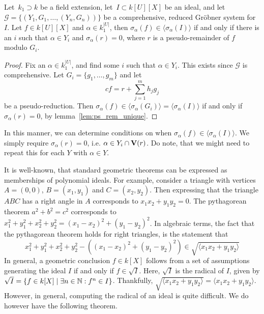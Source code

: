 \begin{theorem}
  Let $\,k_{1} \supset k$ be a field extension, let $\,I \subset k[U][X]$ be an ideal, and let $\mathcal G = \{(Y_{1}, G_{1}, \dots, (Y_{n}, G_{n}))\}$ be a comprehensive, reduced Gröbner system for $I$. Let $f \in k[U][X]$ and $\alpha \in k_{1}^{|U|}$, then $\sigma_{\alpha}(f) \in \langle \sigma_{\alpha}(I) \rangle$ if and only if there is an $i$ such that $\alpha \in Y_{i}$ and $\sigma_{\alpha}(r) = 0$, where $r$ is a pseudo-remainder of $f$ modulo $G_{i}$.
\end{theorem}
\begin{proof}
  Fix an $\alpha \in k_{1}^{|U|}$, and find some $i$ such that $\alpha \in Y_{i}$. This exists since $\mathcal G$ is comprehensive. Let $G_{i} = \{g_{1}, \dots, g_{m}\}$ and let
  \[c f = r + \sum_{j=1}^{m} h_{j} g_{j}\]
  be a pseudo-reduction. Then $\sigma_{\alpha}(f) \in \langle \sigma_{\alpha}(G_{i}) \rangle = \langle \sigma_{\alpha}(I) \rangle$ if and only if $\sigma_{\alpha}(r) = 0$, by lemma~\ref{lem:ps_rem_unique}.
\end{proof}

In this manner, we can determine conditions on when $\sigma_{\alpha}(f) \in \langle \sigma_{\alpha}(I) \rangle$. We simply require $\sigma_{\alpha}(r) = 0$, i.e. $\alpha \in Y_{i} \cap \operatorname{\mathbf V}(r)$. Do note, that we might need to repeat this for each $Y$ with $\alpha \in Y$.

It is well-known, that standard geometric theorems can be expressed as memberships of polynomial ideals. For example, consider a triangle with vertices $A = (0, 0)$, $B = (x_{1}, y_{1})$ and $C = (x_{2}, y_{2})$. Then expressing that the triangle $ABC$ has a right angle in $A$ corresponds to $x_{1} x_{2} + y_{1} y_{2} = 0$. The pythagorean theorem $a^{2} + b^{2} = c^{2}$ corresponds to $x_{1}^{2} + y_{1}^{2} + x_{2}^{2} + y_{2}^{2} = {(x_{1} - x_{2})}^{2} + {(y_{1} - y_{2})}^{2}$. In algebraic terms, the fact that the pythagorean theorem holds for right triangles, is the statement that
\[x_{1}^{2} + y_{1}^{2} + x_{2}^{2} + y_{2}^{2} - \left({(x_{1} - x_{2})}^{2} + {(y_{1} - y_{2})}^{2}\right) \in \sqrt{\langle x_{1} x_{2} + y_{1} y_{2} \rangle} \]
In general, a geometric conclusion $f \in k[X]$ follows from a set of assumptions generating the ideal $I$ if and only if $f \in \sqrt{I}$. Here, $\sqrt{I}$ is the radical of $I$, given by $\sqrt{I} = \{f \in k[X] \mid \exists n \in \mathbb{N} : f^{n} \in I\}$. Thankfully, $\sqrt{ \langle x_{1} x_{2} + y_{1} y_{2} \rangle } = \langle x_{1} x_{2} + y_{1} y_{2} \rangle$. However, in general, computing the radical of an ideal is quite difficult. We do however have the following theorem.

